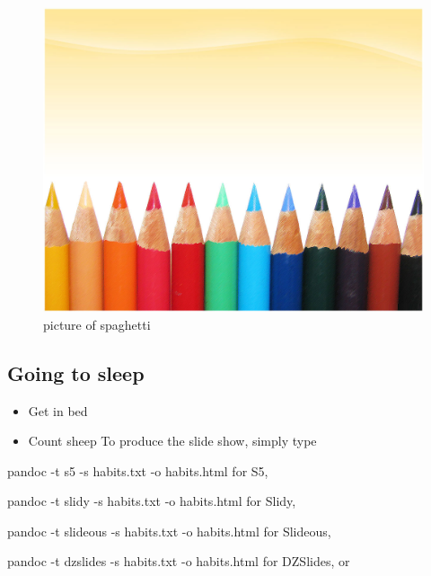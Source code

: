 \documentclass[]{article}
\begin{document}
\begin{figure}[htbp]
\centering
\includegraphics{image.png}
\caption{picture of spaghetti}
\end{figure}

\subsection{Going to sleep}\label{going-to-sleep}

\begin{itemize}
\itemsep1pt\parskip0pt
\item
  Get in bed
\item
  Count sheep To produce the slide show, simply type
\end{itemize}

pandoc -t s5 -s habits.txt -o habits.html for S5,

pandoc -t slidy -s habits.txt -o habits.html for Slidy,

pandoc -t slideous -s habits.txt -o habits.html for Slideous,

pandoc -t dzslides -s habits.txt -o habits.html for DZSlides, or
\end{document}
